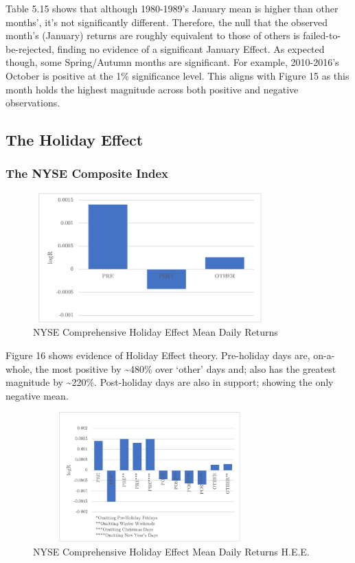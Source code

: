 \documentclass[11pt, english]{article}
\begin{document}
	Table 5.15 shows that although 1980-1989’s January mean is higher than other months', it’s not significantly different. Therefore, the null that the observed month’s (January) returns are roughly equivalent to those of others is failed-to-be-rejected, finding no evidence of a significant January Effect. As expected though, some Spring/Autumn months are significant. For example, 2010-2016’s October is positive at the 1\% significance level. This aligns with Figure 15 as this month holds the highest magnitude across both positive and negative observations.

	\newpage

	\subsection{The Holiday Effect}

		\subsubsection{The NYSE Composite Index}

	\begin{figure}[H]
        \begin{center}
                \includegraphics[width=9cm,height=5cm]{NYSE-HE1.png} 
                \caption{NYSE Comprehensive Holiday Effect Mean Daily Returns}
        \end{center}
        \end{figure}

	Figure 16 shows evidence of Holiday Effect theory. Pre-holiday days are, on-a-whole, the most positive by \~{}480\% over `other' days and; also has the greatest magnitude by \~{}220\%. Post-holiday days are also in support; showing the only negative mean.

	\begin{figure}[H]
        \begin{center}
                \includegraphics[width=9cm,height=5cm]{NYSE-HE2.png}              
		\caption{NYSE Comprehensive Holiday Effect Mean Daily Returns H.E.E.}
        \end{center}
        \end{figure}
\end{document}
